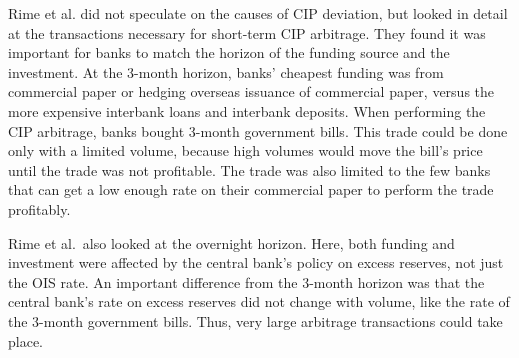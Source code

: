 





Rime et al.\cite{Rime2017} did not speculate on the causes of CIP deviation, but looked in detail at the transactions necessary for short-term CIP arbitrage.  They found it was important for banks to match the horizon of the funding source and the investment.  At the 3-month horizon, banks' cheapest funding was from commercial paper or hedging overseas issuance of commercial paper, versus the more expensive interbank loans and interbank deposits.  When performing the CIP arbitrage, banks bought 3-month government bills.  This trade could be done only with a limited volume, because high volumes would move the bill's price until the trade was not profitable.  The trade was also limited to the few banks that can get a low enough rate on their commercial paper to perform the trade profitably.  

Rime et al.\ also looked at the overnight horizon.  Here, both funding and investment were affected by the central bank's policy on excess reserves, not just the OIS rate.  An important difference from the 3-month horizon was that the central bank's rate on excess reserves did not change with volume, like the rate of the 3-month government bills.  Thus, very large arbitrage transactions could take place.  

